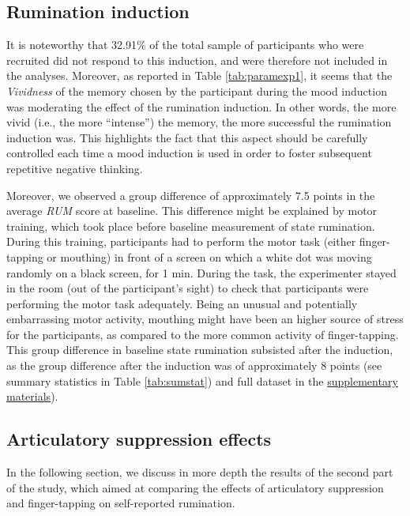 \documentclass[a4paper,12pt,twoside,openright,oldfontcommands]{memoir}
\begin{document}
\hypertarget{rumination-induction-4}{%
\subsection{Rumination induction}\label{rumination-induction-4}}

It is noteworthy that 32.91\% of the total sample of participants who were recruited did not respond to this induction, and were therefore not included in the analyses. Moreover, as reported in Table \ref{tab:paramexp1}, it seems that the \emph{Vividness} of the memory chosen by the participant during the mood induction was moderating the effect of the rumination induction. In other words, the more vivid (i.e., the more \enquote{intense}) the memory, the more successful the rumination induction was. This highlights the fact that this aspect should be carefully controlled each time a mood induction is used in order to foster subsequent repetitive negative thinking.

Moreover, we observed a group difference of approximately 7.5 points in the average \emph{RUM} score at baseline. This difference might be explained by motor training, which took place before baseline measurement of state rumination. During this training, participants had to perform the motor task (either finger-tapping or mouthing) in front of a screen on which a white dot was moving randomly on a black screen, for 1 min. During the task, the experimenter stayed in the room (out of the participant's sight) to check that participants were performing the motor task adequately. Being an unusual and potentially embarrassing motor activity, mouthing might have been an higher source of stress for the participants, as compared to the more common activity of finger-tapping. This group difference in baseline state rumination subsisted after the induction, as the group difference after the induction was of approximately 8 points (see summary statistics in Table \ref{tab:sumstat}) and full dataset in the \protect\hyperlink{suppCh6}{supplementary materials}).

\hypertarget{articulatory-suppression-effects-1}{%
\subsection{Articulatory suppression effects}\label{articulatory-suppression-effects-1}}

In the following section, we discuss in more depth the results of the second part of the study, which aimed at comparing the effects of articulatory suppression and finger-tapping on self-reported rumination.
\end{document}
